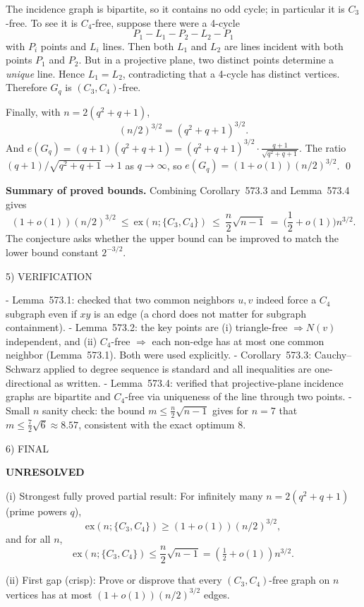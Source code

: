 The incidence graph is bipartite, so it contains no odd cycle; in particular it is $C_3$-free.
To see it is $C_4$-free, suppose there were a 4-cycle
\[
P_1-L_1-P_2-L_2-P_1
\]
with $P_i$ points and $L_i$ lines. Then both $L_1$ and $L_2$ are lines incident with both points $P_1$ and $P_2$.
But in a projective plane, two distinct points determine a \emph{unique} line. Hence $L_1=L_2$, contradicting that a 4-cycle has distinct vertices.
Therefore $G_q$ is $(C_3,C_4)$-free.

Finally, with $n=2(q^2+q+1)$,
\[
(n/2)^{3/2}=(q^2+q+1)^{3/2}.
\]
And
$e(G_q)=(q+1)(q^2+q+1)=(q^2+q+1)^{3/2}\cdot \frac{q+1}{\sqrt{q^2+q+1}}$.
The ratio $(q+1)/\sqrt{q^2+q+1}\to 1$ as $q\to\infty$, so $e(G_q)=(1+o(1))(n/2)^{3/2}$.
\qed

\medskip
\textbf{Summary of proved bounds.}
Combining Corollary~573.3 and Lemma~573.4 gives
\[
(1+o(1))(n/2)^{3/2}\ \le\ \mathrm{ex}(n;\{C_3,C_4\})\ \le\ \frac{n}{2}\sqrt{n-1}\ =\ \Big(\frac12+o(1)\Big)n^{3/2}.
\]
The conjecture asks whether the upper bound can be improved to match the lower bound constant $2^{-3/2}$.

5) VERIFICATION

- Lemma~573.1: checked that two common neighbors $u,v$ indeed force a $C_4$ subgraph even if $xy$ is an edge (a chord does not matter for subgraph containment).
- Lemma~573.2: the key points are (i) triangle-free $\Rightarrow N(v)$ independent, and (ii) $C_4$-free $\Rightarrow$ each non-edge has at most one common neighbor (Lemma~573.1). Both were used explicitly.
- Corollary~573.3: Cauchy--Schwarz applied to degree sequence is standard and all inequalities are one-directional as written.
- Lemma~573.4: verified that projective-plane incidence graphs are bipartite and $C_4$-free via uniqueness of the line through two points.
- Small $n$ sanity check: the bound $m\le \frac{n}{2}\sqrt{n-1}$ gives for $n=7$ that $m\le \frac72\sqrt6\approx 8.57$, consistent with the exact optimum $8$.

6) FINAL

\textbf{UNRESOLVED}

(i) Strongest fully proved partial result:  
For infinitely many $n=2(q^2+q+1)$ (prime powers $q$),
\[\mathrm{ex}(n;\{C_3,C_4\})\ge (1+o(1))(n/2)^{3/2},\]
and for all $n$,
\[\mathrm{ex}(n;\{C_3,C_4\})\le \frac{n}{2}\sqrt{n-1}=(\tfrac12+o(1))n^{3/2}.
\]

(ii) First gap (crisp):  
Prove or disprove that every $(C_3,C_4)$-free graph on $n$ vertices has at most $(1+o(1))(n/2)^{3/2}$ edges.

